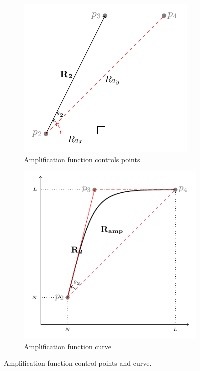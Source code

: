 \documentclass[a4paper,11pt]{ijamas}
\begin{document}
\begin{figure}[!t]
\begin{subfigure}{.48\textwidth}
  \centering
  \includegraphics[width=0.80\columnwidth]{figs/3.pdf}
 \caption{Amplification function controls points}
  \label{fig:ampcontrolpoints}
\end{subfigure}%
\begin{subfigure}{.48\textwidth}
  \centering
  \includegraphics[width=0.80\columnwidth]{figs/4.pdf}
 \caption{Amplification function curve}
  \label{fig:ampcurve}
\end{subfigure}%
\caption{Amplification function control points and curve.}
\label{fig:ampcalculation}
\end{figure}
\end{document}
